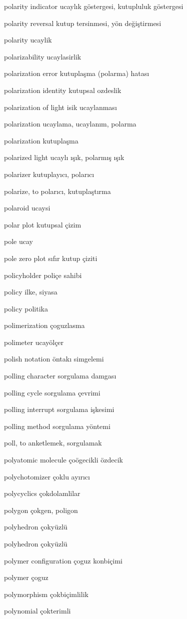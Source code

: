 \documentclass[12pt,fleqn]{article}\usepackage{../../common}
\begin{document}
polarity indicator ucaylık göstergesi, kutupluluk göstergesi

polarity reversal kutup tersinmesi, yön değiştirmesi

polarity ucaylik

polarizability ucaylasirlik

polarization error kutuplaşma (polarma) hatası

polarization identity kutupsal ozdeslik

polarization of light isik ucaylanması

polarization ucaylama, ucaylanım, polarma

polarization kutuplaşma

polarized light ucaylı ışık, polarmış ışık

polarizer kutuplayıcı, polarıcı

polarize, to polarıcı, kutuplaştırma

polaroid ucaysi

polar plot kutupsal çizim

pole ucay

pole zero plot sıfır kutup çiziti

policyholder poliçe sahibi

policy ilke, siyasa

policy politika

polimerization çoguzlasma

polimeter ucayölçer

polish notation öntakı simgelemi

polling character sorgulama damgası

polling cycle sorgulama çevrimi

polling interrupt sorgulama işkesimi

polling method sorgulama yöntemi

poll, to anketlemek, sorgulamak

polyatomic molecule çoögecikli özdecik

polychotomizer çoklu ayırıcı

polycyclics çokdolamlilar

polygon çokgen, poligon

polyhedron çokyüzlü

polyhedron çokyüzlü

polymer configuration çoguz konbiçimi

polymer çoguz

polymorphism çokbiçimlilik

polynomial çokterimli
\end{document}
